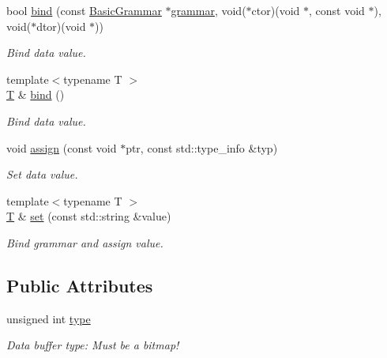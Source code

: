 \begin{DoxyCompactItemize}
bool \hyperlink{class_d_d4hep_1_1_opaque_data_block_a237aa4d85136b95af80cd46be06a1053}{bind} (const \hyperlink{class_d_d4hep_1_1_basic_grammar}{BasicGrammar} $\ast$\hyperlink{class_d_d4hep_1_1_opaque_data_ac911f7e23be3e5d583bf5ccebae03e31}{grammar}, void($\ast$ctor)(void $\ast$, const void $\ast$), void($\ast$dtor)(void $\ast$))
\begin{DoxyCompactList}\small\item\em Bind data value. \item\end{DoxyCompactList}\item 
{\footnotesize template$<$typename T $>$ }\\\hyperlink{class_t}{T} \& \hyperlink{class_d_d4hep_1_1_opaque_data_block_a3aa9b95d8df9109bb52f5f19711bee43}{bind} ()
\begin{DoxyCompactList}\small\item\em Bind data value. \item\end{DoxyCompactList}\item 
void \hyperlink{class_d_d4hep_1_1_opaque_data_block_a0e0adbb76c89f89adced464ca9e79bd7}{assign} (const void $\ast$ptr, const std::type\_\-info \&typ)
\begin{DoxyCompactList}\small\item\em Set data value. \item\end{DoxyCompactList}\item 
{\footnotesize template$<$typename T $>$ }\\\hyperlink{class_t}{T} \& \hyperlink{class_d_d4hep_1_1_opaque_data_block_a69737512e448c58b88d34095b9155e53}{set} (const std::string \&value)
\begin{DoxyCompactList}\small\item\em Bind grammar and assign value. \item\end{DoxyCompactList}\end{DoxyCompactItemize}
\subsection*{Public Attributes}
\begin{DoxyCompactItemize}
\item 
unsigned int \hyperlink{class_d_d4hep_1_1_opaque_data_block_a6e7306f78bcdfcf15f53fdc6a2f34457}{type}
\begin{DoxyCompactList}\small\item\em Data buffer type: Must be a bitmap! \item\end{DoxyCompactList}\end{DoxyCompactItemize}
